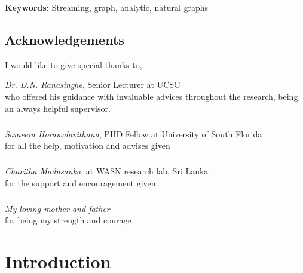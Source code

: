 \documentclass[12pt]{report}
\numberwithin{figure}{section}
\numberwithin{table}{section}
\begin{document}
\textbf{Keywords:} Streaming, graph, analytic, natural graphs 

\newpage

\section*{Acknowledgements}
%

I would like to give special thanks to,

\begin{center}

 \emph{Dr. D.N. Ranasinghe}, Senior Lecturer at UCSC\\
 who offered his guidance with invaluable advices throughout the research, being an always helpful supervisor.
 
\paragraph{}

\emph{Sameera Horawalavithana}, PHD Fellow at University of South Florida\\
for all the help, motivation and advises given \\

\paragraph{}

\emph{Charitha Madusanka}, at WASN research lab, Sri Lanka\\
 for the support and encouragement given.
 
\paragraph{}
\emph{My loving mother and father}\\
for being my strength and courage

\end{center}
\newpage

\listoffigures

\listoftables

\tableofcontents

\newpage
{}



\chapter{Introduction}
\end{document}

